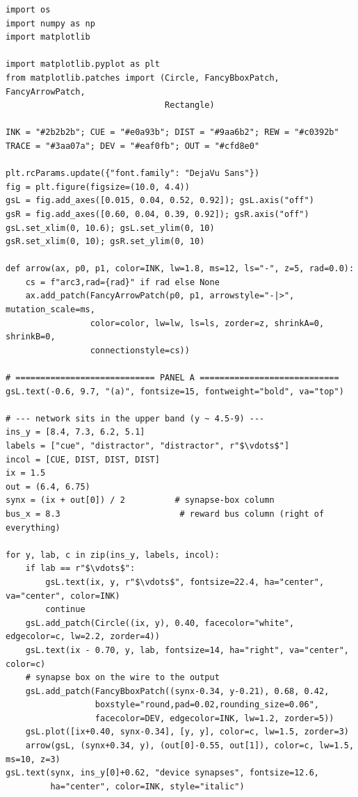 \begin{lstlisting}[caption={schematics.ipynb code cell 6},label={lst:mrl-nb-schematics-6}]
import os
import numpy as np
import matplotlib

import matplotlib.pyplot as plt
from matplotlib.patches import (Circle, FancyBboxPatch, FancyArrowPatch,
                                Rectangle)

INK = "#2b2b2b"; CUE = "#e0a93b"; DIST = "#9aa6b2"; REW = "#c0392b"
TRACE = "#3aa07a"; DEV = "#eaf0fb"; OUT = "#cfd8e0"

plt.rcParams.update({"font.family": "DejaVu Sans"})
fig = plt.figure(figsize=(10.0, 4.4))
gsL = fig.add_axes([0.015, 0.04, 0.52, 0.92]); gsL.axis("off")
gsR = fig.add_axes([0.60, 0.04, 0.39, 0.92]); gsR.axis("off")
gsL.set_xlim(0, 10.6); gsL.set_ylim(0, 10)
gsR.set_xlim(0, 10); gsR.set_ylim(0, 10)

def arrow(ax, p0, p1, color=INK, lw=1.8, ms=12, ls="-", z=5, rad=0.0):
    cs = f"arc3,rad={rad}" if rad else None
    ax.add_patch(FancyArrowPatch(p0, p1, arrowstyle="-|>", mutation_scale=ms,
                 color=color, lw=lw, ls=ls, zorder=z, shrinkA=0, shrinkB=0,
                 connectionstyle=cs))

# ============================ PANEL A ============================
gsL.text(-0.6, 9.7, "(a)", fontsize=15, fontweight="bold", va="top")

# --- network sits in the upper band (y ~ 4.5-9) ---
ins_y = [8.4, 7.3, 6.2, 5.1]
labels = ["cue", "distractor", "distractor", r"$\vdots$"]
incol = [CUE, DIST, DIST, DIST]
ix = 1.5
out = (6.4, 6.75)
synx = (ix + out[0]) / 2          # synapse-box column
bus_x = 8.3                        # reward bus column (right of everything)

for y, lab, c in zip(ins_y, labels, incol):
    if lab == r"$\vdots$":
        gsL.text(ix, y, r"$\vdots$", fontsize=22.4, ha="center", va="center", color=INK)
        continue
    gsL.add_patch(Circle((ix, y), 0.40, facecolor="white", edgecolor=c, lw=2.2, zorder=4))
    gsL.text(ix - 0.70, y, lab, fontsize=14, ha="right", va="center", color=c)
    # synapse box on the wire to the output
    gsL.add_patch(FancyBboxPatch((synx-0.34, y-0.21), 0.68, 0.42,
                  boxstyle="round,pad=0.02,rounding_size=0.06",
                  facecolor=DEV, edgecolor=INK, lw=1.2, zorder=5))
    gsL.plot([ix+0.40, synx-0.34], [y, y], color=c, lw=1.5, zorder=3)
    arrow(gsL, (synx+0.34, y), (out[0]-0.55, out[1]), color=c, lw=1.5, ms=10, z=3)
gsL.text(synx, ins_y[0]+0.62, "device synapses", fontsize=12.6,
         ha="center", color=INK, style="italic")


\end{lstlisting}
